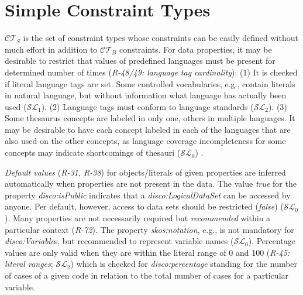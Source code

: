 \documentclass{llncs}
\begin{document}
{{%

\section{Simple Constraint Types}

$\mathcal{CT}_{S}$ is the set of constraint types whose constraints can be easily defined without much effort in addition to $\mathcal{CT}_{B}$ constraints.
For data properties, it may be desirable to restrict that values of predefined languages must be present for determined number of times (\emph{R-48/49: language tag cardinality}):
(1) It is checked if literal language tags are set. Some controlled vocabularies, e.g., contain literals in natural language, but without information what language has actually been used ($\mathcal{SL}_{1}$). 
(2) Language tags must conform to language standards ($\mathcal{SL}_{2}$). 
(3) Some thesaurus concepts are labeled in only one, others in multiple languages. 
It may be desirable to have each concept labeled in each of the languages that are also used on the other concepts,
as language coverage incompleteness for some concepts may indicate shortcomings of thesauri ($\mathcal{SL}_{0}$)
\cite{MaderHaslhoferIsaac2012}.

\emph{Default values} (\emph{R-31, R-38}) for objects/literals of given properties are inferred automatically when properties are not present in the data.
The value \emph{true} for the property {\em disco:isPublic} indicates that a {\em disco:LogicalDataSet} can be accessed by anyone.
Per default, however, access to data sets should be restricted (\emph{false}) ($\mathcal{SL}_{0}$).
Many properties are not necessarily required but \emph{recommended} within a particular context (\emph{R-72}).
The property {\em skos:notation}, e.g., is not mandatory for {\em disco:Variable}s, but recommended to represent variable names ($\mathcal{SL}_{0}$).
Percentage values are only valid when they are within the literal range of 0 and 100 (\emph{R-45: literal ranges}; $\mathcal{SL}_{2}$)
which is checked for \emph{disco:percentage} standing for the number of cases of a given code in relation to the total number of cases for a particular variable.

}}
\end{document}
